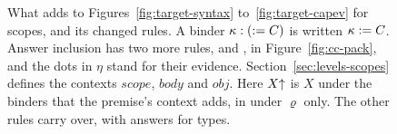 \begin{figure}[t]
\color{black}
\caption{What \treeCC adds to Figures~\ref{fig:target-syntax} to~\ref{fig:target-capev} for scopes, and its changed rules. A binder $\kappa : (\mathrel{:=}C)$ is written $\kappa \mathrel{:=}C$. Answer inclusion has two more rules,  and , in Figure~\ref{fig:cc-pack}, and the dots in $\eta$ stand for their evidence. Section~\ref{sec:levels-scopes} defines the contexts $\mathit{scope}$, $\mathit{body}$ and $\mathit{obj}$. Here $X{\uparrow}$ is $X$ under the binders that the premise's context adds, in  under $\varrho$ only. The other rules carry over, with answers for types.}
\label{fig:cc}
\end{figure}

